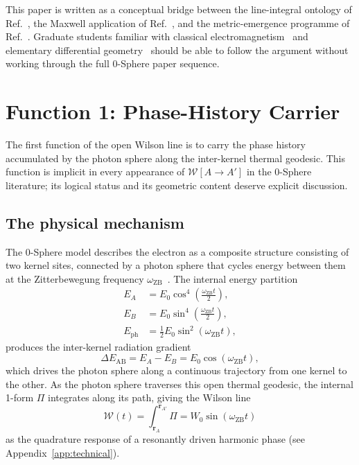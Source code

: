 \documentclass[%
 reprint, amsmath,amssymb, aps, prb, ]{revtex4-2}
\numberwithin{equation}{section}
\newcommand{\omZB}{\omega_{\text{ZB}}}
\newcommand{\EphS}{E_{\text{ph}}}
\newcommand{\Egrad}{\Delta E_{\text{AB}}}
\newcommand{\WL}{\mathcal{W}}
\begin{document}
This paper is written as a conceptual bridge between the line-integral ontology of Ref.~\cite{hanamura31}, the Maxwell application of Ref.~\cite{hanamura54}, and the metric-emergence programme of Ref.~\cite{hanamura51}. Graduate students familiar with classical electromagnetism~\cite{Jackson1998} and elementary differential geometry~\cite{Nakahara2003} should be able to follow the argument without working through the full 0-Sphere paper sequence.

\section{Function 1: Phase-History Carrier}
\label{sec:history}

The first function of the open Wilson line is to carry the phase history accumulated by the photon sphere along the inter-kernel thermal geodesic. This function is implicit in every appearance of $\WL[A\to A']$ in the 0-Sphere literature; its logical status and its geometric content deserve explicit discussion.

\subsection{The physical mechanism}

The 0-Sphere model describes the electron as a composite structure consisting of two kernel sites, connected by a photon sphere that cycles energy between them at the Zitterbewegung frequency $\omZB$~\cite{hanamura01, hanamura33}. The internal energy partition~\cite{hanamura01}
\begin{align}
E_A &= E_0\cos^4\!\!\left(\tfrac{\omZB t}{2}\right), \label{eq:EA}\\
E_B &= E_0\sin^4\!\!\left(\tfrac{\omZB t}{2}\right), \label{eq:EB}\\
\EphS &= \tfrac{1}{2}E_0\sin^2(\omZB t), \label{eq:Eph}
\end{align}
produces the inter-kernel radiation gradient
\begin{equation}
\Egrad = E_A - E_B = E_0\cos(\omZB t),
\label{eq:grad}
\end{equation}
which drives the photon sphere along a continuous trajectory from one kernel to the other. As the photon sphere traverses this open thermal geodesic, the internal 1-form $\Pi$ integrates along its path, giving the Wilson line
\begin{equation}
\WL(t) = \int_{\mathbf{r}_A}^{\mathbf{r}_{A'}}\Pi = W_0 \sin(\omZB t)
\label{eq:WL_dynamical}
\end{equation}
as the quadrature response of a resonantly driven harmonic phase (see Appendix~\ref{app:technical}).
\end{document}
